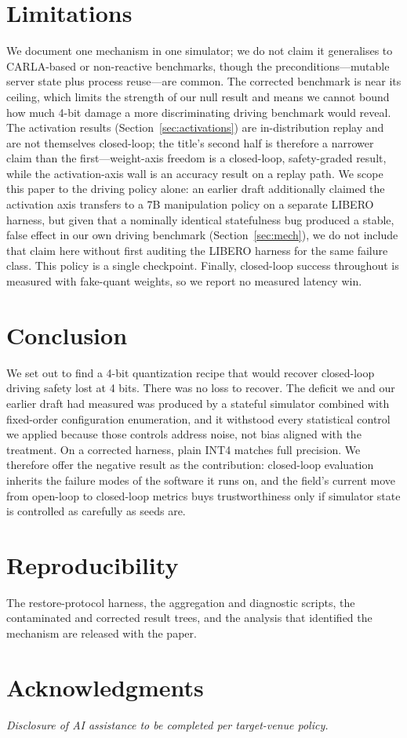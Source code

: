 \documentclass[conference]{IEEEtran}
\begin{document}
\section{Limitations}
We document one mechanism in one simulator; we do not claim it generalises to CARLA-based or
non-reactive benchmarks, though the preconditions---mutable server state plus process reuse---are
common. The corrected benchmark is near its ceiling, which limits the strength of our null result
and means we cannot bound how much 4-bit damage a more discriminating driving benchmark would
reveal. The activation results (Section~\ref{sec:activations}) are in-distribution replay and are 
not
themselves closed-loop; the title's second half is therefore a narrower claim than the
first---weight-axis freedom is a closed-loop, safety-graded result, while the activation-axis wall
is an accuracy result on a replay path. We scope this paper to the driving policy alone: an
earlier draft additionally claimed the activation axis transfers to a 7B manipulation policy on a
separate LIBERO harness, but given that a nominally identical statefulness bug produced a stable,
false effect in our own driving benchmark (Section~\ref{sec:mech}), we do not include that claim
here without first auditing the LIBERO harness for the same failure class. This policy is a single
checkpoint. Finally, closed-loop success throughout is measured with fake-quant weights, so we
report no measured latency win.

\section{Conclusion}
We set out to find a 4-bit quantization recipe that would recover closed-loop driving safety lost
at 4 bits. There was no loss to recover. The deficit we and our earlier draft had measured was
produced by a stateful simulator combined with fixed-order configuration enumeration, and it
withstood every statistical control we applied because those controls address noise, not bias
aligned with the treatment. On a corrected harness, plain INT4 matches full precision. We
therefore offer the negative result as the contribution: closed-loop evaluation inherits the
failure modes of the software it runs on, and the field's current move from open-loop to
closed-loop metrics buys trustworthiness only if simulator state is controlled as carefully as
seeds are.

\section*{Reproducibility}
The restore-protocol harness, the aggregation and diagnostic scripts, the contaminated and
corrected result trees, and the analysis that identified the mechanism are released with the
paper.

\section*{Acknowledgments}
\emph{Disclosure of AI assistance to be completed per target-venue policy.}
\end{document}

